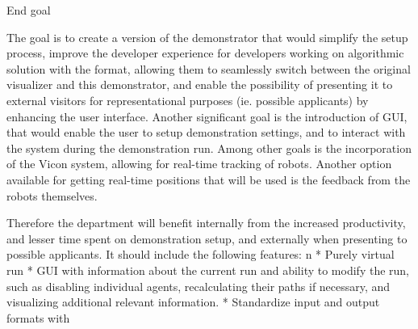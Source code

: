 \sec End goal

The goal is to create a version of the demonstrator that would simplify the setup process, improve the developer experience for developers working on algorithmic solution with the {\mapfIR} format, allowing them to seamlessly switch between the original visualizer and this demonstrator, and enable the possibility of presenting it to external visitors for representational purposes (ie. possible applicants) by enhancing the user interface.\br
Another significant goal is the introduction of GUI, that would enable the user to setup demonstration settings, and to interact with the system during the demonstration run.
Among other goals is the incorporation of the Vicon system, allowing for real-time tracking of robots. Another option available for getting real-time positions that will be used is the feedback from the robots themselves.

Therefore the department will benefit internally from the increased productivity, and lesser time spent on demonstration setup, and externally when presenting to possible applicants.
It should include the following features:
\begitems \style n
    * Purely virtual run
    * GUI with information about the current run and ability to modify the run, such as disabling individual agents, recalculating their paths if necessary, and visualizing additional relevant information.
    * Standardize input and output formats with \mapfIR
\enditems